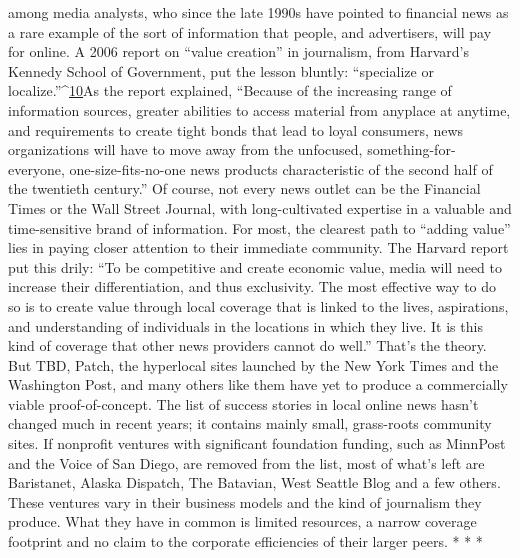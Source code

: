 among media analysts, who since the late 1990s have pointed to financial news
as a rare example of the sort of information that people, and advertisers, will pay
for online.
A 2006 report on ``value creation'' in journalism, from Harvard's Kennedy
School of Government, put the lesson bluntly: ``specialize or localize.''^{\href{#endnotes-chapter-3}{10}}As the
report explained, ``Because of the increasing range of information sources, greater
abilities to access material from anyplace at anytime, and requirements to create
tight bonds that lead to loyal consumers, news organizations will have to move
away from the unfocused, something-for-everyone, one-size-fits-no-one news
products characteristic of the second half of the twentieth century.''
Of course, not every news outlet can be the Financial Times or the Wall Street
Journal, with long-cultivated expertise in a valuable and time-sensitive brand of
information. For most, the clearest path to ``adding value'' lies in paying closer attention
to their immediate community. The Harvard report put this drily: ``To be
competitive and create economic value, media will need to increase their differentiation,
and thus exclusivity. The most effective way to do so is to create value
through local coverage that is linked to the lives, aspirations, and understanding
of individuals in the locations in which they live. It is this kind of coverage that
other news providers cannot do well.''
That's the theory. But TBD, Patch, the hyperlocal sites launched by the New
York Times and the Washington Post, and many others like them have yet to
produce a commercially viable proof-of-concept. The list of success stories in
local online news hasn't changed much in recent years; it contains mainly small,
grass-roots community sites. If nonprofit ventures with significant foundation
funding, such as MinnPost and the Voice of San Diego, are removed from the
list, most of what's left are Baristanet, Alaska Dispatch, The Batavian, West Seattle
Blog and a few others.
These ventures vary in their business models and the kind of journalism they
produce. What they have in common is limited resources, a narrow coverage
footprint and no claim to the corporate efficiencies of their larger peers.
* * *

